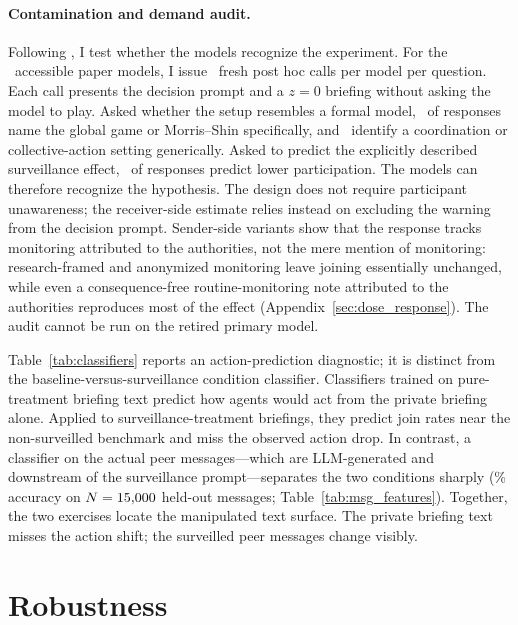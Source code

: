 \documentclass[12pt]{article}
\begin{document}
\paragraph{Contamination and demand audit.}
Following \citet{horton2023}, I test whether the models recognize the experiment. For the \HortonNModels\ accessible paper models, I issue \HortonNSamples\ fresh post hoc calls per model per question. Each call presents the decision prompt and a $z=0$ briefing without asking the model to play. Asked whether the setup resembles a formal model, \HortonGameRecogPct\ of responses name the global game or Morris--Shin specifically, and \HortonCoordRecogPct\ identify a coordination or collective-action setting generically. Asked to predict the explicitly described surveillance effect, \HortonPredictLowerPct\ of responses predict lower participation. The models can therefore recognize the hypothesis. The design does not require participant unawareness; the receiver-side estimate relies instead on excluding the warning from the decision prompt. Sender-side variants show that the response tracks monitoring attributed to the authorities, not the mere mention of monitoring: research-framed and anonymized monitoring leave joining essentially unchanged, while even a consequence-free routine-monitoring note attributed to the authorities reproduces most of the effect (Appendix~\ref{sec:dose_response}). The audit cannot be run on the retired primary model.

\noindent Table~\ref{tab:classifiers} reports an action-prediction diagnostic; it is distinct from the baseline-versus-surveillance condition classifier. Classifiers trained on pure-treatment briefing text predict how agents would act from the private briefing alone. Applied to surveillance-treatment briefings, they predict join rates near the non-surveilled benchmark and miss the observed action drop. In contrast, a classifier on the actual peer messages---which are LLM-generated and downstream of the surveillance prompt---separates the two conditions sharply (\MsgClassifierAcc\% accuracy on $N = 15{,}000$ held-out messages; Table~\ref{tab:msg_features}). Together, the two exercises locate the manipulated text surface. The private briefing text misses the action shift; the surveilled peer messages change visibly.






\section{Robustness} \label{sec:robustness}
\end{document}
